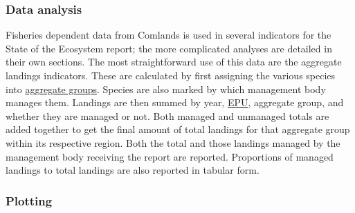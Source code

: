\documentclass[]{article}
\begin{document}
\subsubsection{Data analysis}\label{data-analysis}

Fisheries dependent data from Comlands is used in several indicators for
the State of the Ecosystem report; the more complicated analyses are
detailed in their own sections. The most straightforward use of this
data are the aggregate landings indicators. These are calculated by
first assigning the various species into
\protect\hyperlink{aggroups}{aggregate groups}. Species are also marked
by which management body manages them. Landings are then summed by year,
\protect\hyperlink{epu}{EPU}, aggregate group, and whether they are
managed or not. Both managed and unmanaged totals are added together to
get the final amount of total landings for that aggregate group within
its respective region. Both the total and those landings managed by the
management body receiving the report are reported. Proportions of
managed landings to total landings are also reported in tabular form.

\subsubsection{Plotting}\label{plotting}
\end{document}
